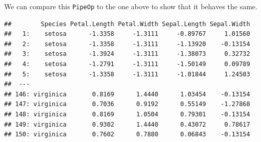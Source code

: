 \documentclass[]{scrbook}
\newenvironment{Shaded}{\begin{snugshade}}{\end{snugshade}}
\newcommand{\DecValTok}[1]{\textcolor[rgb]{0.00,0.00,0.81}{#1}}
\newcommand{\KeywordTok}[1]{\textcolor[rgb]{0.13,0.29,0.53}{\textbf{#1}}}
\newcommand{\NormalTok}[1]{#1}
\newcommand{\OperatorTok}[1]{\textcolor[rgb]{0.81,0.36,0.00}{\textbf{#1}}}
\newcommand{\StringTok}[1]{\textcolor[rgb]{0.31,0.60,0.02}{#1}}
\renewenvironment{Shaded} {\begin{snugshade}\small} {\end{snugshade}}
\begin{document}
We can compare this \texttt{PipeOp} to the one above to show that it behaves the same.

\begin{Shaded}
\end{Shaded}

\begin{Shaded}
\end{Shaded}

\begin{verbatim}
##        Species Petal.Length Petal.Width Sepal.Length Sepal.Width
##   1:    setosa      -1.3358     -1.3111     -0.89767     1.01560
##   2:    setosa      -1.3358     -1.3111     -1.13920    -0.13154
##   3:    setosa      -1.3924     -1.3111     -1.38073     0.32732
##   4:    setosa      -1.2791     -1.3111     -1.50149     0.09789
##   5:    setosa      -1.3358     -1.3111     -1.01844     1.24503
##  ---                                                            
## 146: virginica       0.8169      1.4440      1.03454    -0.13154
## 147: virginica       0.7036      0.9192      0.55149    -1.27868
## 148: virginica       0.8169      1.0504      0.79301    -0.13154
## 149: virginica       0.9302      1.4440      0.43072     0.78617
## 150: virginica       0.7602      0.7880      0.06843    -0.13154
\end{verbatim}

\begin{Shaded}
\end{Shaded}
\end{document}
